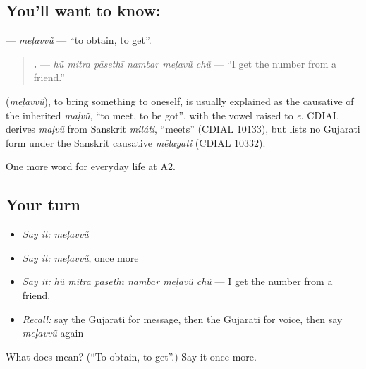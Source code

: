 \subsection*{You'll want to know: }
\textbf{} — \emph{meḷavvũ} — \textquotedblleft{}to obtain, to get\textquotedblright{}.

\begin{quote}
\textbf{     .} — \emph{hũ mitra pāsethī nambar meḷavũ chũ} — \textquotedblleft{}I get the number from a friend.\textquotedblright{}
\end{quote}

\begin{cousinweb}
\textbf{} (\emph{meḷavvũ}), to bring something to oneself, is usually explained as the causative of the inherited \emph{maḷvũ}, \textquotedblleft{}to meet, to be got\textquotedblright{}, with the vowel raised to \emph{e}. CDIAL derives \emph{maḷvũ} from Sanskrit \emph{miláti}, \textquotedblleft{}meets\textquotedblright{} (CDIAL 10133), but lists no Gujarati form under the Sanskrit causative \emph{mēlayati} (CDIAL 10332).
\end{cousinweb}

\begin{grammarlens}[title={What you've built}]
One more word for everyday life at A2.
\end{grammarlens}

\subsection*{Your turn}
\begin{itemize}
\raggedright
  \item \emph{Say it:} \emph{meḷavvũ}
  \item \emph{Say it:} \emph{meḷavvũ}, once more
  \item \emph{Say it:} \emph{hũ mitra pāsethī nambar meḷavũ chũ} — I get the number from a friend.
  \item \emph{Recall:} say the Gujarati for message, then the Gujarati for voice, then say \emph{meḷavvũ} again
\end{itemize}

\begin{tcolorbox}[breakable,colback=teal!4,colframe=teal!35!black,title={Before you move on}]
What does  mean? (\textquotedblleft{}To obtain, to get\textquotedblright{}.) Say it once more.
\end{tcolorbox}
